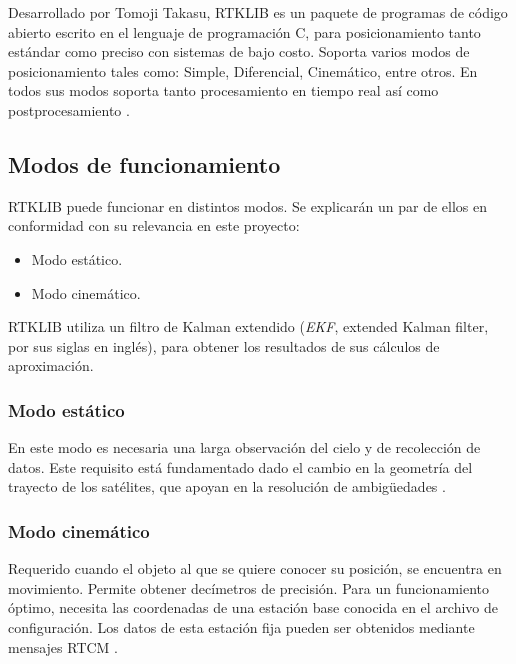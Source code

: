 
Desarrollado por Tomoji Takasu, RTKLIB es un paquete de programas de código abierto escrito en el lenguaje de programación C, para posicionamiento tanto estándar como preciso con sistemas de bajo costo. Soporta varios modos de posicionamiento tales como: Simple, Diferencial, Cinemático, entre otros. En todos sus modos soporta tanto procesamiento en tiempo real así como postprocesamiento \citep{takasu2009development}.

\subsection{Modos de funcionamiento}

RTKLIB puede funcionar en distintos modos. Se explicarán un par de ellos en conformidad con su relevancia en este proyecto:

\begin{itemize}
\item Modo estático.
\item Modo cinemático.
\end{itemize}

RTKLIB utiliza un filtro de Kalman extendido (\textit{EKF}, extended Kalman filter, por sus siglas en inglés), para obtener los resultados de sus cálculos de aproximación. 

\subsubsection{Modo estático}
En este modo es necesaria una larga observación del cielo y de recolección de datos. Este requisito está fundamentado dado el cambio en la geometría del trayecto de los satélites, que apoyan en la resolución de ambigüedades \citep{wisniewski2013evaluation}.

\subsubsection{Modo cinemático}
Requerido cuando el objeto al que se quiere conocer su posición, se encuentra en movimiento. Permite obtener decímetros de precisión. Para un funcionamiento óptimo, necesita las coordenadas de una estación base conocida en el archivo de configuración. Los datos de esta estación fija pueden ser obtenidos mediante mensajes RTCM \citep{wisniewski2013evaluation}.


